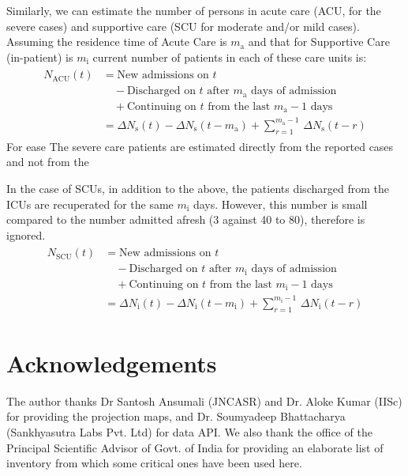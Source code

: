 \documentclass{article}
\newcommand{\ns}{\ensuremath{N_{\mathrm{s}}}}
\newcommand{\nin}{\ensuremath{N_{\mathrm{i}}}}
\newcommand{\nacu}{\ensuremath{N_{\mathrm{ACU}}}}
\newcommand{\nscu}{\ensuremath{N_{\mathrm{SCU}}}}
\newcommand{\ma}{\ensuremath{m_{\mathrm{a}}}}
\newcommand{\mi}{\ensuremath{m_{\mathrm{i}}}}
\begin{document}
Similarly, we can estimate the number of persons in acute care (ACU,
for the severe cases) and supportive care (SCU for moderate and/or
mild cases).  Assuming the residence time of Acute Care is $\ma$ and
that for Supportive Care (in-patient) is $\mi$ current number of patients in each
of these care units is:
\begin{align}
  \label{eq:nacu0}
  \begin{split}
  \nacu(t)
  &= \text{New admissions on $t$}\\
  & \quad - \text{Discharged on $t$ after $\ma$ days of admission}\\
  & \quad + \text{Continuing on $t$ from the last $\ma-1$ days} \\
   &= \Delta \ns (t)
    - \Delta \ns(t-\ma)
    + \sum_{r=1}^{\ma-1} \, \Delta \ns(t-r)
  \end{split}
\end{align}
For ease The severe care patients are estimated directly from the reported
cases and not from the 


In the case of SCUs, in addition to the above, the
patients discharged from the ICUs are recuperated for the same $\mi$
days. However, this number is small compared to the number admitted
afresh (3 against 40 to 80), therefore is ignored.
\begin{align}
  \label{eq:nscu0}
  \begin{split}
  \nscu(t)
  &= \text{New admissions on $t$}\\
  & \quad - \text{Discharged on $t$ after $\mi$ days of admission}\\
  & \quad + \text{Continuing on $t$ from the last $\mi-1$ days} \\
   &= \Delta \nin (t)
    - \Delta \nin(t-\mi)
    + \sum_{r=1}^{\mi-1} \, \Delta \nin(t-r)
  \end{split}
\end{align}




\section{Acknowledgements}
The author thanks Dr Santosh Ansumali (JNCASR) and Dr. Aloke Kumar
(IISc) for providing the projection maps, and Dr. Soumyadeep
Bhattacharya (Sankhyasutra Labs Pvt. Ltd) for data API. We also thank
the office of the Principal Scientific Advisor of Govt. of India for
providing an elaborate list of inventory from which some critical ones
have been used here.
\end{document}
